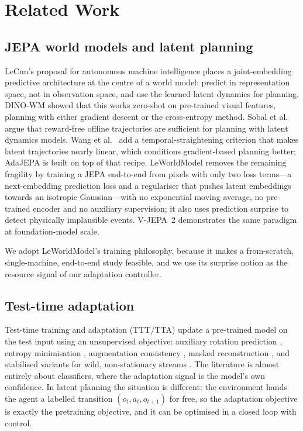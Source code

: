\section{Related Work}

\subsection{JEPA world models and latent planning}

LeCun's proposal for autonomous machine intelligence \cite{lecun-2022-path} places a
joint-embedding predictive architecture at the centre of a world model: predict in
representation space, not in observation space, and use the learned latent dynamics for
planning. DINO-WM \cite{zhou-2025-dinowm} showed that this works zero-shot on pre-trained
visual features, planning with either gradient descent or the cross-entropy method. Sobal et
al.\ \cite{sobal-2025-offline} argue that reward-free offline trajectories are sufficient for
planning with latent dynamics models. Wang et al.\ \cite{wang-2026-temporal} add a
temporal-straightening criterion that makes latent trajectories nearly linear, which
conditions gradient-based planning better; AdaJEPA \cite{wang-2026-adajepa} is built on top
of that recipe. LeWorldModel \cite{maes-2026-lewm} removes the remaining fragility by training
a JEPA end-to-end from pixels with only two loss terms---a next-embedding prediction loss and
a regulariser that pushes latent embeddings towards an isotropic Gaussian---with no
exponential moving average, no pre-trained encoder and no auxiliary supervision; it also uses
prediction surprise to detect physically implausible events. V-JEPA~2
\cite{assran-2025-vjepa2} demonstrates the same paradigm at foundation-model scale.

We adopt LeWorldModel's training philosophy, because it makes a from-scratch, single-machine,
end-to-end study feasible, and we use its surprise notion as the resource signal of our
adaptation controller.

\subsection{Test-time adaptation}

Test-time training and adaptation (TTT/TTA) update a pre-trained model on the test input using
an unsupervised objective: auxiliary rotation prediction \cite{sun-2020-ttt}, entropy
minimisation \cite{wang-2021-tent}, augmentation consistency \cite{zhang-2022-memo}, masked
reconstruction \cite{gandelsman-2022-mttt}, and stabilised variants for wild, non-stationary
streams \cite{niu-2022-efficient,niu-2023-stable,wang-2022-cotta}. The literature is almost
entirely about classifiers, where the adaptation signal is the model's own confidence. In
latent planning the situation is different: the environment hands the agent a labelled
transition $(o_t,a_t,o_{t+1})$ for free, so the adaptation objective is exactly the
pretraining objective, and it can be optimised in a closed loop with control.

